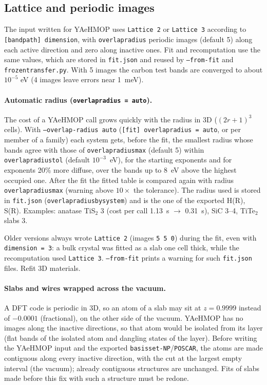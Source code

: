 \documentclass[11pt,a4paper]{article}
\newcommand{\cmd}[1]{\texttt{#1}}
\renewcommand{\_}{\origunderscore\allowbreak}
\begin{document}
\subsection{Lattice and periodic images}\label{sec:lattice}

The input written for YAeHMOP uses \cmd{Lattice 2} or \cmd{Lattice 3} according to
\cmd{[band\_path] dimension}, with \cmd{overlap\_radius} periodic images (default 5) along each active
direction and zero along inactive ones. Fit and recomputation use the same values, which are stored in
\cmd{fit.json} and reused by \cmd{--from-fit} and \cmd{frozen\_transfer.py}. With 5 images the carbon
test bands are converged to about $10^{-5}$ eV (4 images leave errors near 1~meV).

\paragraph{Automatic radius (\cmd{overlap\_radius = auto}).} The cost of a YAeHMOP call grows quickly with the
radius in 3D ($(2r+1)^3$ cells). With \cmd{--overlap-radius auto} (\cmd{[fit] overlap\_radius = auto}, or per member
of a family) each system gets, before the fit, the smallest radius whose bands agree with those of
\cmd{overlap\_radius\_max} (default 5) within \cmd{overlap\_radius\_tol} (default $10^{-3}$~eV), for the starting
exponents and for exponents 20\% more diffuse, over the bands up to 8~eV above the highest occupied one. After
the fit the fitted table is compared again with radius \cmd{overlap\_radius\_max} (warning above $10\times$ the
tolerance). The radius used is stored in \cmd{fit.json} (\cmd{overlap\_radius\_by\_system}) and is the one of the
exported H(R), S(R). Examples: anatase TiS$_2$ 3 (cost per call 1.13~s $\to$ 0.31~s), SiC 3--4, TiTe$_2$ slabs 3.

\begin{aviso}
Older versions always wrote \cmd{Lattice 2} (images \cmd{5 5 0}) during the fit, even with
\cmd{dimension = 3}: a bulk crystal was fitted as a slab one cell thick, while the recomputation used
\cmd{Lattice 3}. \cmd{--from-fit} prints a warning for such \cmd{fit.json} files. Refit 3D materials.
\end{aviso}

\paragraph{Slabs and wires wrapped across the vacuum.} A DFT code is periodic in 3D, so an atom of a slab may
sit at $z=0.9999$ instead of $-0.0001$ (fractional), on the other side of the vacuum. YAeHMOP has no
images along the inactive directions, so that atom would be isolated from its layer (flat bands of the
isolated atom and dangling states of the layer). Before writing the YAeHMOP input and the exported
\cmd{basis\_set-NP}/\cmd{POSCAR}, the atoms are made contiguous along every inactive direction, with the cut
at the largest empty interval (the vacuum); already contiguous structures are unchanged. Fits of slabs made
before this fix with such a structure must be redone.
\end{document}
